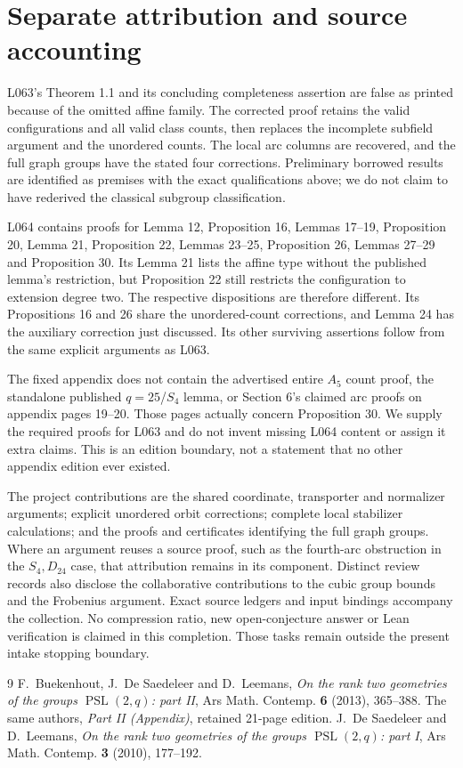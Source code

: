 \documentclass[11pt]{article}
\newcommand{\PSL}{\operatorname{PSL}}\newcommand{\PGL}{\operatorname{PGL}}
\begin{document}
\section{Separate attribution and source accounting}
L063's Theorem 1.1 and its concluding completeness assertion are false
as printed because of the omitted affine family. The corrected proof
retains the valid configurations and all valid class counts, then
replaces the incomplete subfield argument and the unordered counts.
The local arc columns are recovered, and the full graph groups have
the stated four corrections. Preliminary borrowed results are identified
as premises with the exact qualifications above; we do not claim to
have rederived the classical subgroup classification.

L064 contains proofs for Lemma 12, Proposition 16, Lemmas 17--19,
Proposition 20, Lemma 21, Proposition 22, Lemmas 23--25,
Proposition 26, Lemmas 27--29 and Proposition 30. Its Lemma 21
lists the affine type without the published lemma's restriction, but
Proposition 22 still restricts the configuration to extension degree
two. The respective dispositions are therefore different. Its
Propositions 16 and 26 share the unordered-count corrections, and
Lemma 24 has the auxiliary correction just discussed. Its other
surviving assertions follow from the same explicit arguments as L063.

The fixed appendix does not contain the advertised entire $A_5$ count
proof, the standalone published $q=25$/$S_4$ lemma, or Section 6's
claimed arc proofs on appendix pages 19--20. Those pages actually
concern Proposition 30. We supply the required proofs for L063 and
do not invent missing L064 content or assign it extra claims. This is
an edition boundary, not a statement that no other appendix edition
ever existed.

The project contributions are the shared coordinate, transporter and
normalizer arguments; explicit unordered orbit corrections; complete
local stabilizer calculations; and the proofs and certificates identifying
the full graph groups. Where an argument reuses a source proof, such as
the fourth-arc obstruction in the $S_4,D_{24}$ case, that attribution
remains in its component. Distinct review records also disclose the
collaborative contributions to the cubic group bounds and the Frobenius
argument. Exact source ledgers and input bindings accompany the collection.
No compression ratio, new open-conjecture answer or Lean verification is
claimed in this completion. Those tasks remain outside the present intake
stopping boundary.

\begin{thebibliography}{9}
 F.~Buekenhout, J.~De Saedeleer and D.~Leemans,
\emph{On the rank two geometries of the groups $\PSL(2,q)$: part II},
Ars Math. Contemp. \textbf{6} (2013), 365--388.
 The same authors, \emph{Part II (Appendix)},
retained 21-page edition.
 J.~De Saedeleer and D.~Leemans,
\emph{On the rank two geometries of the groups $\PSL(2,q)$: part I},
Ars Math. Contemp. \textbf{3} (2010), 177--192.
\end{thebibliography}
\end{document}
